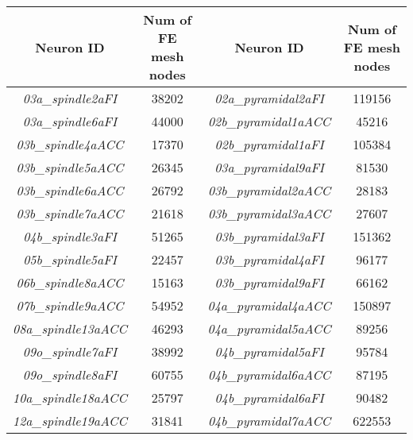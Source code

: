 \begin{tabular}{|c|c|c|c|}
    \hline
    Neuron ID                    & Num of FE mesh nodes & Neuron ID                     & Num of FE mesh nodes \\ \hline
    \textit{03a\_spindle2aFI}    & 38202                & \textit{02a\_pyramidal2aFI}   & 119156               \\ \hline
    \textit{03a\_spindle6aFI}    & 44000                & \textit{02b\_pyramidal1aACC}  & 45216                \\ \hline
    \textit{03b\_spindle4aACC}   & 17370                & \textit{02b\_pyramidal1aFI}   & 105384               \\ \hline
    \textit{03b\_spindle5aACC}   & 26345                & \textit{03a\_pyramidal9aFI}   & 81530                \\ \hline
    \textit{03b\_spindle6aACC}   & 26792                & \textit{03b\_pyramidal2aACC}  & 28183                \\ \hline
    \textit{03b\_spindle7aACC}   & 21618                & \textit{03b\_pyramidal3aACC}  & 27607                \\ \hline
    \textit{04b\_spindle3aFI}    & 51265                & \textit{03b\_pyramidal3aFI}   & 151362               \\ \hline
    \textit{05b\_spindle5aFI}    & 22457                & \textit{03b\_pyramidal4aFI}   & 96177                \\ \hline
    \textit{06b\_spindle8aACC}   & 15163                & \textit{03b\_pyramidal9aFI}   & 66162                \\ \hline
    \textit{07b\_spindle9aACC}   & 54952                & \textit{04a\_pyramidal4aACC}  & 150897               \\ \hline
    \textit{08a\_spindle13aACC}  & 46293                & \textit{04a\_pyramidal5aACC}  & 89256                \\ \hline
    \textit{09o\_spindle7aFI}    & 38992                & \textit{04b\_pyramidal5aFI}   & 95784                \\ \hline
    \textit{09o\_spindle8aFI}    & 60755                & \textit{04b\_pyramidal6aACC}  & 87195                \\ \hline
    \textit{10a\_spindle18aACC}  & 25797                & \textit{04b\_pyramidal6aFI}   & 90482                \\ \hline
    \textit{12a\_spindle19aACC}  & 31841                & \textit{04b\_pyramidal7aACC}  & 622553               \\ \hline

\end{tabular}
